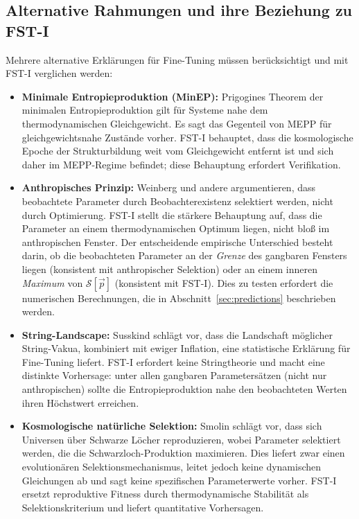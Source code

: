\documentclass[12pt,a4paper]{article}
\theoremstyle{remark}
\begin{document}
\subsection{Alternative Rahmungen und ihre Beziehung zu FST-I}

Mehrere alternative Erkl\"arungen f\"ur Fine-Tuning m\"ussen ber\"ucksichtigt und mit FST-I verglichen werden:

\begin{itemize}
    \item \textbf{Minimale Entropieproduktion (MinEP):} Prigogines Theorem der minimalen Entropieproduktion \citep{Prigogine1967} gilt f\"ur Systeme nahe dem thermodynamischen Gleichgewicht. Es sagt das Gegenteil von MEPP f\"ur gleichgewichtsnahe Zust\"ande vorher. FST-I behauptet, dass die kosmologische Epoche der Strukturbildung weit vom Gleichgewicht entfernt ist und sich daher im MEPP-Regime befindet; diese Behauptung erfordert Verifikation.
    \item \textbf{Anthropisches Prinzip:} Weinberg \citep{Weinberg1987} und andere argumentieren, dass beobachtete Parameter durch Beobachterexistenz selektiert werden, nicht durch Optimierung. FST-I stellt die st\"arkere Behauptung auf, dass die Parameter an einem thermodynamischen Optimum liegen, nicht blo\ss{} im anthropischen Fenster. Der entscheidende empirische Unterschied besteht darin, ob die beobachteten Parameter an der \emph{Grenze} des gangbaren Fensters liegen (konsistent mit anthropischer Selektion) oder an einem inneren \emph{Maximum} von $\mathcal{S}[\vec{p}]$ (konsistent mit FST-I). Dies zu testen erfordert die numerischen Berechnungen, die in Abschnitt~\ref{sec:predictions} beschrieben werden.
    \item \textbf{String-Landscape:} Susskind \citep{Susskind2005} schl\"agt vor, dass die Landschaft m\"oglicher String-Vakua, kombiniert mit ewiger Inflation, eine statistische Erkl\"arung f\"ur Fine-Tuning liefert. FST-I erfordert keine Stringtheorie und macht eine distinkte Vorhersage: unter allen gangbaren Parameters\"atzen (nicht nur anthropischen) sollte die Entropieproduktion nahe den beobachteten Werten ihren H\"ochstwert erreichen.
    \item \textbf{Kosmologische nat\"urliche Selektion:} Smolin \citep{Smolin1992} schl\"agt vor, dass sich Universen \"uber Schwarze L\"ocher reproduzieren, wobei Parameter selektiert werden, die die Schwarzloch-Produktion maximieren. Dies liefert zwar einen evolution\"aren Selektionsmechanismus, leitet jedoch keine dynamischen Gleichungen ab und sagt keine spezifischen Parameterwerte vorher. FST-I ersetzt reproduktive Fitness durch thermodynamische Stabilit\"at als Selektionskriterium und liefert quantitative Vorhersagen.

\end{itemize}
\end{document}
